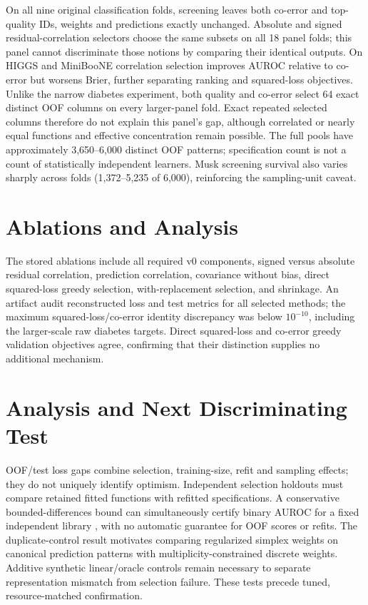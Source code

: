 On all nine original classification folds, screening leaves both co-error and
top-quality IDs, weights and predictions exactly unchanged. Absolute and signed
residual-correlation selectors choose the same subsets on all 18 panel folds;
this panel cannot discriminate those notions by comparing their identical
outputs. On HIGGS and MiniBooNE correlation selection improves AUROC relative to
co-error but worsens Brier, further separating ranking and squared-loss objectives.
Unlike the narrow diabetes experiment, both quality and co-error select 64 exact
distinct OOF columns on every larger-panel fold. Exact repeated selected columns
therefore do not explain this panel's gap, although correlated or nearly equal
functions and effective concentration remain possible. The full pools have
approximately 3,650--6,000 distinct OOF patterns; specification count is not a
count of statistically independent learners. Musk screening survival also varies
sharply across folds (1,372--5,235 of 6,000), reinforcing the sampling-unit caveat.

\section{Ablations and Analysis}
The stored ablations include all required v0 components, signed versus absolute
residual correlation, prediction correlation, covariance without bias, direct
squared-loss greedy selection, with-replacement selection, and shrinkage. An
artifact audit reconstructed loss and test metrics for all selected methods;
the maximum squared-loss/co-error identity discrepancy was below $10^{-10}$,
including the larger-scale raw diabetes targets.
Direct squared-loss and co-error greedy validation objectives agree, confirming
that their distinction supplies no additional mechanism.

\section{Analysis and Next Discriminating Test}
OOF/test loss gaps combine selection, training-size, refit and sampling effects;
they do not uniquely identify optimism. Independent selection holdouts must
compare retained fitted functions with refitted specifications. A conservative
bounded-differences bound can simultaneously certify binary AUROC for a fixed
independent library \citep{mcdiarmid1989}, with no automatic guarantee for OOF
scores or refits. The duplicate-control result motivates comparing regularized
simplex weights on canonical prediction patterns with multiplicity-constrained
discrete weights. Additive synthetic linear/oracle controls remain necessary
to separate representation mismatch from selection failure. These tests precede
tuned, resource-matched confirmation.
